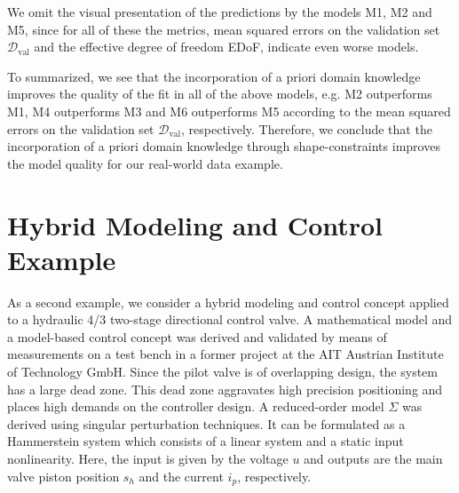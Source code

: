 We omit the visual presentation of the predictions by the models M1, M2 and M5, since for all of these the metrics, mean squared errors on the validation set $\mathcal{D}_{\text{val}}$ and the effective degree of freedom EDoF, indicate even worse models.

To summarized, we see that the incorporation of a priori domain knowledge improves the quality of the fit in all of the above models, e.g. M2 outperforms M1, M4 outperforms M3 and M6 outperforms M5 according to the mean squared errors on the validation set $\mathcal{D}_{\text{val}}$, respectively. Therefore, we conclude that the incorporation of a priori domain knowledge through shape-constraints improves the model quality for our real-world data example. 

\section{Hybrid Modeling and Control Example} \label{sec:real-world-application2}

As a second example, we consider a hybrid modeling and control concept applied to a hydraulic 4/3 two-stage directional control valve. A mathematical model and a model-based control concept was derived and validated by means of measurements on a test bench in a former project at the AIT Austrian Institute of Technology GmbH. Since the pilot valve is of overlapping design, the system has a large dead zone. This dead zone aggravates high precision positioning and places high demands on the controller design. A reduced-order model $\Sigma$ was derived using singular perturbation techniques. It can be formulated as a Hammerstein system which consists of a linear system and a static input nonlinearity. Here, the input is given by the voltage $u$ and outputs are the main valve piston position $s_h$ and the current $i_p$, respectively. 


